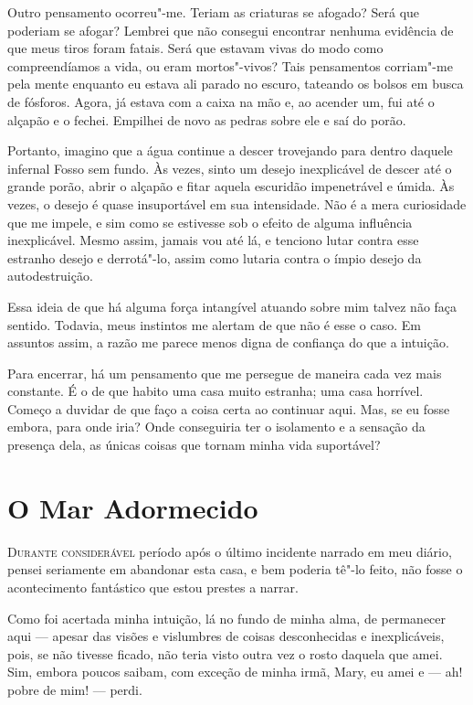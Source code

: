Outro pensamento ocorreu"-me. Teriam as criaturas se afogado? Será que poderiam se afogar? Lembrei que não consegui
encontrar nenhuma evidência de que meus tiros foram fatais. Será que estavam vivas do modo como compreendíamos a vida,
ou eram mortos"-vivos? Tais pensamentos corriam"-me pela mente enquanto eu estava ali parado no escuro, tateando os
bolsos em busca de fósforos. Agora, já estava com a caixa na mão e, ao acender um, fui até o alçapão e o
fechei. Empilhei de novo as pedras sobre ele e saí do porão.

Portanto, imagino que a água continue a descer trovejando para dentro daquele infernal Fosso sem fundo. Às vezes, sinto
um desejo inexplicável de descer até o grande porão, abrir o alçapão e fitar aquela escuridão impenetrável e úmida. Às
vezes, o desejo é quase insuportável em sua intensidade. Não é a mera curiosidade que me impele, e sim como se
estivesse sob o efeito de alguma influência inexplicável. Mesmo assim, jamais vou até lá, e tenciono lutar contra esse
estranho desejo e derrotá"-lo, assim como lutaria contra o ímpio desejo da autodestruição.

Essa ideia de que há alguma força intangível atuando sobre mim talvez não faça sentido. Todavia, meus instintos me
alertam de que não é esse o caso. Em assuntos assim, a razão me parece menos digna de confiança do que a intuição.

Para encerrar, há um pensamento que me persegue de maneira cada vez mais
constante. É o de que habito uma casa muito estranha; uma casa horrível.
Começo a duvidar de que faço a coisa certa ao continuar aqui. Mas, se eu fosse
embora, para onde iria? Onde conseguiria ter o isolamento e a sensação da
presença dela,
as únicas coisas que tornam minha vida suportável?


\clearpage

\chapter{O Mar Adormecido}

\textsc{Durante considerável} período após o último incidente narrado em meu diário, pensei seriamente em abandonar esta
casa, e bem poderia tê"-lo feito, não fosse o acontecimento fantástico que estou prestes a narrar.

Como foi acertada minha intuição, lá no fundo de minha alma, de permanecer aqui --- apesar das visões e vislumbres de
coisas desconhecidas e inexplicáveis, pois, se não tivesse ficado, não teria visto outra vez o rosto daquela que amei.
Sim, embora poucos saibam, com exceção de minha irmã, Mary, eu amei e --- ah! pobre de mim! --- perdi.

